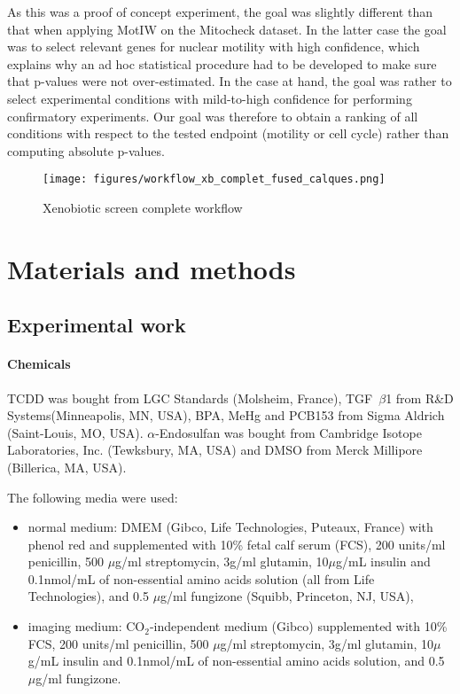 As this was a proof of concept experiment, the goal was slightly different than that when applying MotIW on the Mitocheck dataset. In the latter case the goal was to select relevant genes for nuclear motility with high confidence, which explains why an ad hoc statistical procedure had to be developed to make sure that p-values were not over-estimated. In the case at hand, the goal was rather to select experimental conditions with mild-to-high confidence for performing confirmatory experiments. Our goal was therefore to obtain a ranking of all conditions with respect to the tested endpoint (motility or cell cycle) rather than computing absolute p-values.

\begin{figure}[!ht]
\centering
\texttt{[image: figures/workflow\_xb\_complet\_fused\_calques.png]}
\caption{Xenobiotic screen complete workflow}
\label{xbsc_workflow}
\end{figure}

\section{Materials and methods}
\label{protocoles}
\subsection{Experimental work}
\paragraph{Chemicals}
TCDD was bought from LGC Standards (Molsheim, France), TGF~$\beta$1 from R\&D Systems\texttrademark (Minneapolis, MN, USA), BPA, MeHg and PCB153 from Sigma Aldrich\up{\textregistered} (Saint-Louis, MO, USA). $\alpha$-Endosulfan was bought from Cambridge Isotope Laboratories, Inc. (Tewksbury, MA, USA) and DMSO from Merck Millipore (Billerica, MA, USA).

The following media were used:
\begin{itemize}
\item normal medium: DMEM (Gibco\up{\textregistered}, Life Technologies\texttrademark, Puteaux, France) with phenol red and supplemented with 10\% fetal calf serum (FCS), 200 units/ml penicillin, 500 $\mu$g/ml streptomycin, 3g/ml glutamin, 10$\mu$g/mL insulin and 0.1nmol/mL %
of non-essential amino acids solution (all from Life Technologies\texttrademark), and 0.5 $\mu$g/ml fungizone (Squibb, Princeton, NJ, USA),
\item imaging medium: CO$_2$-independent medium (Gibco\up{\textregistered}) supplemented with 10\% FCS, 200 units/ml penicillin, 500 $\mu$g/ml streptomycin, 3g/ml glutamin, 10$\mu$g/mL insulin and 0.1nmol/mL %
of non-essential amino acids solution, and 0.5 $\mu$g/ml fungizone.
\end{itemize}

